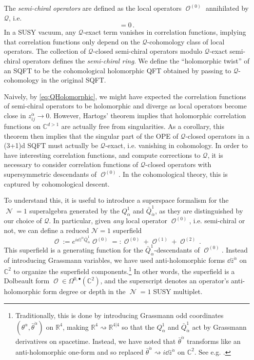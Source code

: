 \documentclass[11pt]{article}
\DeclareMathOperator{\calN}{\mathcal{N}}
\DeclareMathOperator{\calO}{\mathcal{O}}
\def\bbR{\mathbb{R}}
\def\bbC{\mathbb{C}}
\renewcommand{\bm}{\mathcal}
\begin{document}
The \textit{semi-chiral operators} are defined as the local operators $\calO^{(0)}$ annihilated by $\bm{Q}$, i.e.
\begin{equation}
    [\bm{Q}, \calO^{(0)}] = 0\,.
\end{equation}
In a SUSY vacuum, any $\bm{Q}$-exact term vanishes in correlation functions, implying that correlation functions only depend on the $\bm{Q}$-cohomology class of local operators. The collection of $\bm{Q}$-closed semi-chiral operators modulo $\bm{Q}$-exact semi-chiral operators defines the \textit{semi-chiral ring}. We define the ``holomorphic twist'' of an SQFT to be the cohomological holomorphic QFT obtained by passing to $\bm{Q}$-cohomology in the original SQFT.

Naively, by \eqref{eq:QHolomorphic}, we might have expected the correlation functions of semi-chiral operators to be holomorphic and diverge as local operators become close in $z_{ij}^{\dot\alpha} \to 0$. However, Hartogs' theorem implies that holomorphic correlation functions on $\bbC^{d>1}$ are actually free from singularities. As a corollary, this theorem then implies that the singular part of the OPE of $\bm{Q}$-closed operators in a (3+1)d SQFT must actually be $\bm{Q}$-exact, i.e. vanishing in cohomology. In order to have interesting correlation functions, and compute corrections to $\bm{Q}$, it is necessary to consider correlation functions of $\bm{Q}$-closed operators with supersymmetric descendants of $\calO^{(0)}$. In the cohomological theory, this is captured by cohomological descent.

To understand this, it is useful to introduce a superspace formalism for the $\calN=1$ superalgebra generated by the $Q_\alpha^1$ and $\bar{Q}_{\dot\alpha}^1$, as they are distinguished by our choice of $\bm{Q}$. In particular, given \textit{any} local operator $\calO^{(0)}$, i.e. semi-chiral or not, we can define a reduced $\mathcal{N}=1$ superfield
\begin{equation}
    \calO := e^{i \dd\bar{z}^{\dot\alpha} \bar{Q}^1_{\dot\alpha}} \calO^{(0)} =: \calO^{(0)} + \calO^{(1)} + \calO^{(2)}\,.
\end{equation}
This superfield is a generating function for the $\bar{Q}_{\dot\alpha}^1$-descendants of $\calO^{(0)}$. Instead of introducing Grassmann variables, we have used anti-holomorphic forms $\dd \bar{z}^{\dot\alpha}$ on $\bbC^2$ to organize the superfield components.\footnote{Traditionally, this is done by introducing Grassmann odd coordinates $(\theta^\alpha, \bar{\theta}^{\dot\alpha})$ on $\bbR^4$, making $\bbR^4 \rightsquigarrow \bbR^{4|4}$ so that the $Q_{\alpha}^1$ and $\bar{Q}_{\dot\alpha}^1$ act by Grassmann derivatives on spacetime. Instead, we have noted that $\bar{\theta}^{\dot\alpha}$ transforms like an anti-holomorphic one-form and so replaced $\bar{\theta}^{\dot\alpha} \rightsquigarrow i\dd \bar{z}^{\dot\alpha}$ on $\bbC^{2}$. See e.g. \cite{Axelrod:1991vq, Budzik:2023xbr, Bomans:2025klo}.} In other words, the superfield is a Dolbeault form $\calO \in \Omega^{0,\bullet}(\bbC^2)$, and the superscript denotes an operator's anti-holomorphic form degree or depth in the $\calN=1$ SUSY multiplet. 
\end{document}
